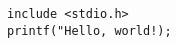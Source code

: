 \lstset{language=C++}          %
\begin{lstlisting}[frame=single]  % Start your code-block
include <stdio.h>
printf("Hello, world!);
\end{lstlisting}